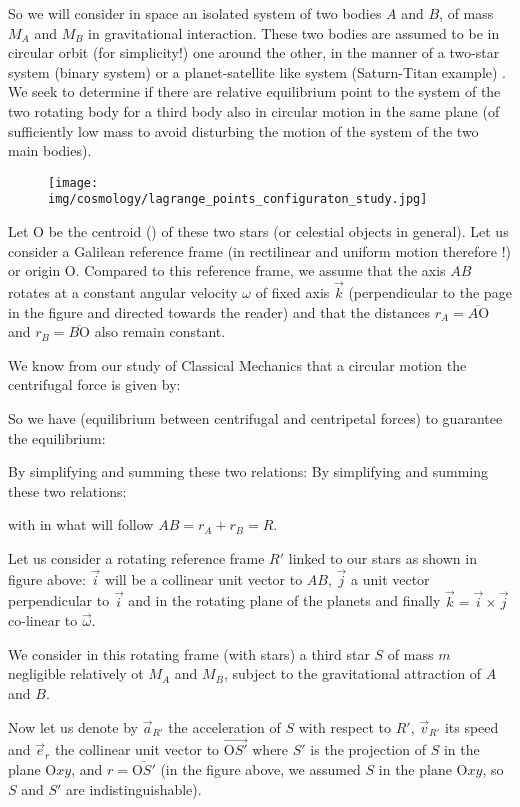	So we will consider in space an isolated system of two bodies $A$ and $B$, of mass $M_A$ and $M_B$ in gravitational interaction. These two bodies are assumed to be in circular orbit (for simplicity!) one around the other, in the manner of a two-star system (binary system) or a planet-satellite like system (Saturn-Titan example) . We seek to determine if there are relative equilibrium point to the system of the two rotating body for  a third body also in circular motion in the same plane (of sufficiently low mass to avoid disturbing the motion of the system of the two main bodies).
	\begin{figure}[H]
		\begin{center}
		\texttt{[image: img/cosmology/lagrange\_points\_configuraton\_study.jpg]}
		\end{center}	
	\end{figure}
	Let O be the centroid () of these two stars (or celestial objects in general). Let us consider a Galilean reference frame (in rectilinear and uniform motion therefore !) or origin O. Compared to this reference frame, we assume that the axis $AB$ rotates at a constant angular velocity $\omega$ of fixed axis $\vec{k}$ (perpendicular to the page in the figure and directed towards the reader) and that the distances $r_A=\overline{A\text{O}}$ and $r_B=\overline{B\text{O}}$ also remain constant.
 
 We know from our study of Classical Mechanics that a circular motion the centrifugal force is given by:
	
	So we have (equilibrium between centrifugal and centripetal forces) to guarantee the equilibrium:
	
	By simplifying and summing these two relations:
	By simplifying and summing these two relations:
	
	with in what will follow $AB=r_A+r_B=R$.
	
	Let us consider a rotating reference frame $R'$ linked to our stars as shown in figure above: $\vec{i}$ will be a collinear unit vector to $AB$, $\vec{j}$ a unit vector perpendicular to $\vec{i}$ and in the rotating plane of the planets and finally $\vec{k}=\vec{i}\times\vec{j}$ co-linear to $\vec{\omega}$.

	We consider in this rotating frame (with stars) a third star $S$ of mass $m$ negligible relatively ot $M_A$ and $M_B$, subject to the gravitational attraction of $A$ and $B$.

	Now let us denote by $\vec{a}_{R'}$ the acceleration of $S$ with respect to $R'$, $\vec{v}_{R'}$ its speed and $\vec{e}_r$ the collinear  unit vector to $\overrightarrow{\text{O}S'}$ where $S'$ is the projection of $S$ in the plane O$xy$, and $r=\overline{\text{O}S'}$ (in the figure above, we assumed $S$ in the plane O$xy$, so $S$ and $S'$ are indistinguishable).
	
